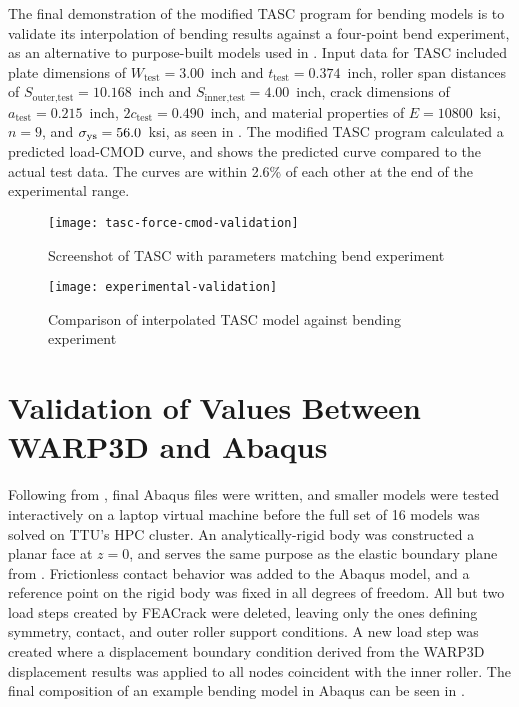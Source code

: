 The final demonstration of the modified TASC program for bending models is to validate its interpolation of bending results against a four-point bend experiment, as an alternative to purpose-built models used in .
Input data for TASC included plate dimensions of \(W_\text{test}=3.00\)~inch and \(t_\text{test}=0.374\)~inch, roller span distances of \(S_\text{outer,test}=10.168\)~inch and \(S_\text{inner,test}=4.00\)~inch, crack dimensions of \(a_\text{test}=0.215\)~inch, \(2c_\text{test}=0.490\)~inch, and material properties of \(E=10800\)~ksi, \(n=9\), and \(\sigma_{\textnormal{ys}}=56.0\)~ksi, as seen in .
The modified TASC program calculated a predicted load-CMOD curve, and  shows the predicted curve compared to the actual test data.
The curves are within 2.6\% of each other at the end of the experimental range.

\begin{figure}[tbp]
\centering
\texttt{[image: tasc-force-cmod-validation]}
\caption{\label{fig:tasc-force-cmod-validation} Screenshot of TASC with parameters matching bend experiment}
\end{figure}
\begin{figure}[tbp]
\centering
\texttt{[image: experimental-validation]}
\caption{\label{fig:experimental-validation} Comparison of interpolated TASC model against bending experiment}
\end{figure}

\section{Validation of \J Values Between WARP3D and Abaqus}

Following from , final Abaqus files were written, and smaller models were tested interactively on a laptop virtual machine before the full set of 16 models was solved on TTU's HPC cluster.
An analytically-rigid body was constructed a planar face at \(z=0\), and serves the same purpose as the elastic boundary plane from .
Frictionless contact behavior was added to the Abaqus model, and a reference point on the rigid body was fixed in all degrees of freedom.
All but two load steps created by FEACrack were deleted, leaving only the ones defining symmetry, contact, and outer roller support conditions.
A new load step was created where a displacement boundary condition derived from the WARP3D displacement results was applied to all nodes coincident with the inner roller.
The final composition of an example bending model in Abaqus can be seen in .
\begin{sidewaysfigure}[tbp]
\centering
\texttt{[image: \{abq\_bc\_ac02\_at02]}}
\caption{\label{fig:abq_bc_ac02_at02} Example Abaqus assembly and boundary conditions (\(\frac{a}{c}=0.2\), \(\frac{a}{t}=0.2\))}
\end{sidewaysfigure}

